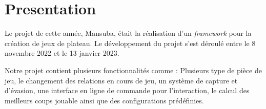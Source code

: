 \section{Presentation}

Le projet de cette année, Mansuba, était la réalisation d'un \emph{framework} pour la création de jeux de plateau.
Le développement du projet s'est déroulé entre le 8 novembre 2022 et le 13 janvier 2023. 

Notre projet contient plusieurs fonctionnalités comme : Plusieurs type de pièce de jeu, le changement des relations en cours de jeu, 
un système de capture et d'évasion, une interface en ligne de commande pour l'interaction, le calcul des meilleurs coups jouable ainsi que 
des configurations prédéfinies.

